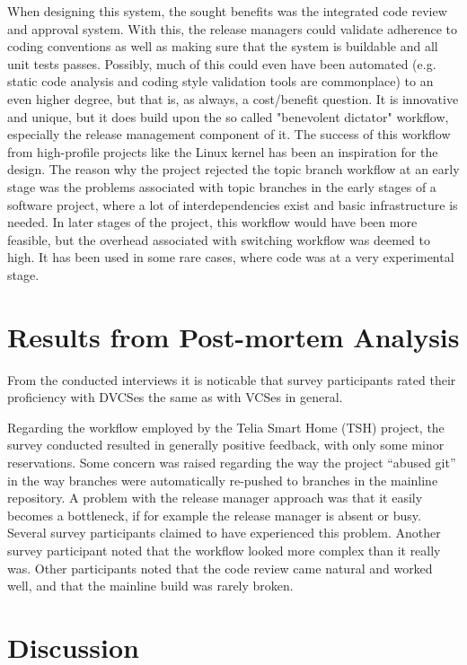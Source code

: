 \documentclass{llncs}
\begin{document}
When designing this system, the sought benefits was the integrated code 
review and approval system. With this, the release managers could validate 
adherence to coding conventions as well as making sure that the system
is buildable and all unit tests passes. Possibly, much of this could even
have been automated (e.g. static code analysis and coding style validation
tools are commonplace) to an even higher degree, but that is, as always, a 
cost/benefit question. It is innovative and unique, but it does build upon
the so called "benevolent dictator" workflow, especially the release
management component of it. The success of this workflow from high-profile 
projects like the Linux kernel has been an inspiration for the design.
The reason why the project rejected the topic branch workflow at an early
stage was the problems associated with topic branches in the early stages
of a software project, where a lot of interdependencies exist and basic
infrastructure is needed. In later stages of the project, this workflow
would have been more feasible, but the overhead associated with switching
workflow was deemed to high. It has been used in some rare cases, where code
was at a very experimental stage.

\section{Results from Post-mortem Analysis}

From the conducted interviews it is noticable that survey participants
rated their proficiency with DVCSes the same as with VCSes in general.

Regarding the workflow employed by the Telia Smart Home (TSH)
project, the survey conducted resulted in generally positive feedback,
with only some minor reservations. Some concern was raised regarding
the way the project ``abused git'' in the way branches were
automatically re-pushed to branches in the mainline
repository. A problem with the release manager approach was that it
easily becomes a bottleneck, if for example the release manager is
absent or busy. Several survey participants claimed to have
experienced this problem. Another survey participant noted that the
workflow looked more complex than it really was. Other participants
noted that the code review came natural and worked well, and that the
mainline build was rarely broken.

\section{Discussion}
\end{document}
